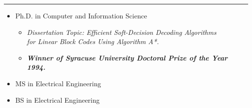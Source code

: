 


{\sf
{} } \hrule

\begin{llist}

 
\vspace{-.2in}
\begin{itemize}
\item {Ph.D. in Computer and Information Science 
\vspace{-0.2in}
   \begin{itemize}
   \item{{\em Dissertation Topic: Efficient Soft-Decision Decoding
Algorithms \\
for
Linear Block Codes Using Algorithm A*.}}
   \item{{\em\bf Winner of Syracuse University Doctoral Prize of
   the Year 1994.}}
   \end{itemize}}
\end{itemize}

 
\vspace{-.2in}
\begin{itemize}
\item {MS in Electrical Engineering }
\item {BS in Electrical Engineering }
\end{itemize}


\end{llist}
